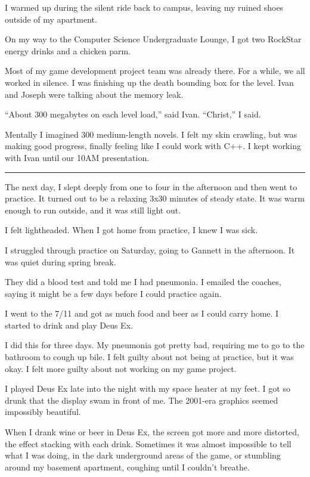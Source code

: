 I warmed up during the silent ride back to campus, leaving my ruined shoes
outside of my apartment.  

On my way to the Computer Science Undergraduate Lounge, I got two RockStar
energy drinks and a chicken parm.

Most of my game development project team was already there.  For a while, we all
worked in silence.  I was finishing up the death bounding box for the level.
Ivan and Joseph were talking about the memory leak.

``About 300 megabytes on each level load,'' said Ivan.  ``Christ,'' I said.

Mentally I imagined 300 medium-length novels.  I felt my skin crawling, but was
making good progress, finally feeling like I could work with C++.  I kept
working with Ivan until our 10AM presentation.

\plainfancybreak{12pt}{2}{* * *}

The next day, I slept deeply from one to four in the afternoon and then went to
practice.  It turned out to be a relaxing 3x30 minutes of steady state.  It
was warm enough to run outside, and it was still light out.

I felt lightheaded.  When I got home from practice, I knew I was sick.  

I struggled through practice on Saturday, going to Gannett in the afternoon.  It
was quiet during spring break.

They did a blood test and told me I had pneumonia.  I emailed the coaches,
saying it might be a few days before I could practice again.

I went to the 7/11 and got as much food and beer as I could carry home.  I
started to drink and play Deus Ex.  

I did this for three days.  My pneumonia got pretty bad, requiring me to go to
the bathroom to cough up bile.  I felt guilty about not being at practice, but
it was okay.  I felt more guilty about not working on my game project. 
 
I played Deus Ex late into the night with my space heater at my feet.  I got so
drunk that the display swam in front of me.  The 2001-era graphics seemed
impossibly beautiful.  

When I drank wine or beer in Deus Ex, the screen got more and more distorted,
the effect stacking with each drink.  Sometimes it was almost impossible to tell
what I was doing, in the dark underground areas of the game, or stumbling around
my basement apartment, coughing until I couldn't breathe.

